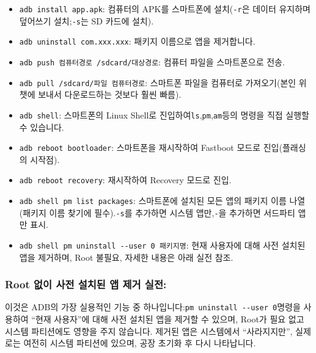 \begin{itemize}
  \item \texttt{adb install app.\allowbreak apk}: 컴퓨터의 APK를 스마트폰에 설치(\texttt{-\allowbreak r}은 데이터 유지하며 덮어쓰기 설치;\texttt{-\allowbreak s}는 SD 카드에 설치).
  \item \texttt{adb uninstall com.\allowbreak xxx.\allowbreak xxx}: 패키지 이름으로 앱을 제거합니다.
  \item \texttt{adb push 컴퓨터경로 /\allowbreak sdcard/\allowbreak 대상경로}: 컴퓨터 파일을 스마트폰으로 전송.
  \item \texttt{adb pull /\allowbreak sdcard/\allowbreak 파일 컴퓨터경로}: 스마트폰 파일을 컴퓨터로 가져오기(본인 위챗에 보내서 다운로드하는 것보다 훨씬 빠름).
  \item \texttt{adb shell}: 스마트폰의 Linux Shell로 진입하여\texttt{ls},\texttt{pm},\texttt{am}등의 명령을 직접 실행할 수 있습니다.
  \item \texttt{adb reboot bootloader}: 스마트폰을 재시작하여 Fastboot 모드로 진입(플래싱의 시작점).
  \item \texttt{adb reboot recovery}: 재시작하여 Recovery 모드로 진입.
  \item \texttt{adb shell pm list packages}: 스마트폰에 설치된 모든 앱의 패키지 이름 나열(패키지 이름 찾기에 필수).\texttt{-\allowbreak s}를 추가하면 시스템 앱만,\texttt{-}을 추가하면 서드파티 앱만 표시.
  \item \texttt{adb shell pm uninstall -\allowbreak -\allowbreak user 0 패키지명}: 현재 사용자에 대해 사전 설치된 앱을 제거하며, Root 불필요, 자세한 내용은 아래 실전 참조.
\end{itemize}

\subsubsection*{Root 없이 사전 설치된 앱 제거 실전:}

이것은 ADB의 가장 실용적인 기능 중 하나입니다:\texttt{pm uninstall -\allowbreak -\allowbreak user 0}명령을 사용하여 “현재 사용자”에 대해 사전 설치된 앱을 제거할 수 있으며, Root가 필요 없고 시스템 파티션에도 영향을 주지 않습니다. 제거된 앱은 시스템에서 “사라지지만”, 실제로는 여전히 시스템 파티션에 있으며, 공장 초기화 후 다시 나타납니다.

